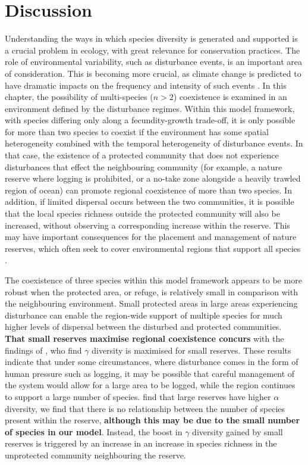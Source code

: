 \section{Discussion}
Understanding the ways in which species diversity is generated and supported is a crucial problem in ecology, with great relevance for conservation practices. The role of environmental variability, such as disturbance events, is an important area of consideration. This is becoming more crucial, as climate change is predicted to have dramatic impacts on the frequency and intensity of such events \citep[e.g.][]{webster2005changes}. In this chapter, the possibility of multi-species ($n>2$) coexistence is examined in an environment defined by the disturbance regimes. Within this model framework, with species differing only along a fecundity-growth trade-off, it is only possible for more than two species to coexist if the environment has some spatial heterogeneity combined with the temporal heterogeneity of disturbance events. In that case, the existence of a protected community that does not experience disturbances that effect the neighbouring community (for example, a nature reserve where logging is prohibited, or a no-take zone alongside a heavily trawled region of ocean) can promote regional coexistence of more than two species. In addition, if limited dispersal occurs between the two communities, it is possible that the local species richness outside the protected community will also be increased, without observing a corresponding increase within the reserve. This may have important consequences for the placement and management of nature reserves, which often seek to cover environmental regions that support all species \citep[e.g.][]{margules1988selecting,scott2001nature}.

The coexistence of three species within this model framework appears to be more robust when the protected area, or refuge, is relatively small in comparison with the neighbouring environment. Small protected areas in large areas experiencing disturbance can enable the region-wide support of multiple species for much higher levels of dispersal between the disturbed and protected communities. \textbf{That small reserves maximise regional coexistence concurs }with the findings of \cite{lasky2013reserve}, who find $\gamma$ diversity is maximised for small reserves. These results indicate that under some circumstances, where disturbance comes in the form of human pressure such as logging, it may be possible that careful management of the system would allow for a large area to be logged, while the region continues to support a large number of species.
\cite{lasky2013reserve} find that large reserves have higher $\alpha$ diversity, we find that there is no relationship between the number of species present within the reserve, \textbf{although this may be due to the small number of species in our model}. Instead, the boost in $\gamma$ diversity gained by small reserves is triggered by an increase in an increase in species richness in the unprotected community neighbouring the reserve.

